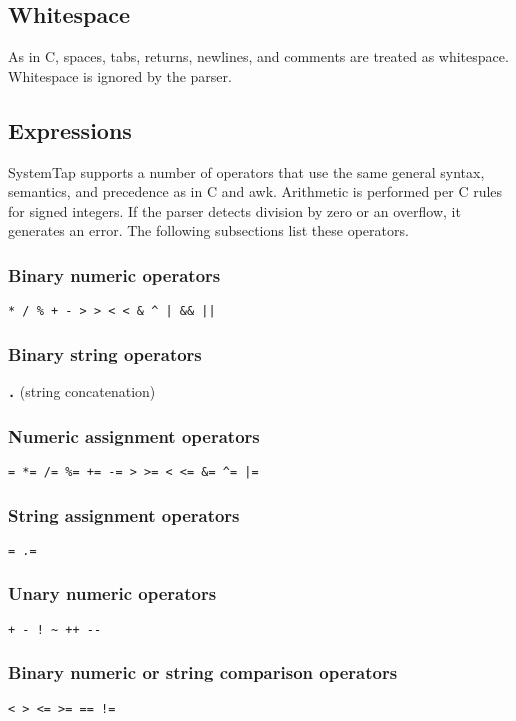 \documentclass[twoside,english]{article}
\begin{document}
\subsection{Whitespace}
As in C, spaces, tabs, returns, newlines, and comments are treated as whitespace.
Whitespace is ignored by the parser.


\subsection{Expressions}
SystemTap supports a number of operators that use the same general syntax,
semantics, and precedence as in C and awk. Arithmetic is performed per C
rules for signed integers. If the parser detects division by zero or an overflow,
it generates an error. The following subsections list these operators.

\subsubsection{Binary numeric operators}
\texttt{{*} / \% + - >\,{}> <\,{}< \& \textasciicircum{}
| \&\& ||}

\subsubsection{Binary string operators}
\texttt{\textbf{.}} (string concatenation)

\subsubsection{Numeric assignment operators}
\texttt{= {*}= /= \%= += -= >\,{}>= <\,{}<=
\&= \textasciicircum{}= |=}

\subsubsection{String assignment operators}

\texttt{= .=}

\subsubsection{Unary numeric operators}
\texttt{+ - ! \textasciitilde{} ++ -{}-}

\subsubsection{Binary numeric or string comparison operators}
\texttt{< > <= >= == !=}
\end{document}
